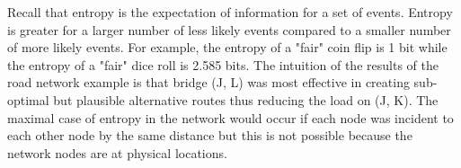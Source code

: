Recall that entropy is the expectation of information for a set of events. Entropy is greater for a larger number of less likely events compared to a smaller number of more likely events. For example, the entropy of a "fair" coin flip is 1 bit while the entropy of a "fair" dice roll is 2.585 bits. The intuition of the results of the road network example is that bridge (J, L) was most effective in creating sub-optimal but plausible alternative routes thus reducing the load on (J, K). The maximal case of entropy in the network would occur if each node was incident to each other node by the same distance but this is not possible because the network nodes are at physical locations.